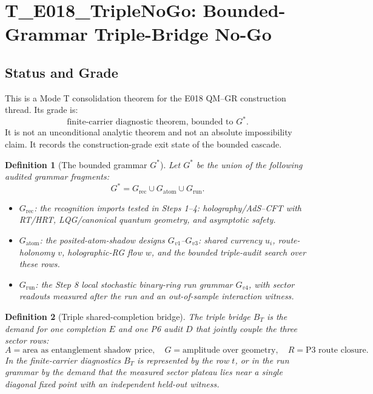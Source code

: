 \documentclass[11pt]{article}
\newtheorem{definition}{Definition}
\begin{document}
\section*{T\_E018\_TripleNoGo: Bounded-Grammar Triple-Bridge No-Go}

\subsection*{Status and Grade}

This is a Mode T consolidation theorem for the E018 QM--GR construction thread.
Its grade is:
\[
  \text{finite-carrier diagnostic theorem, bounded to }G^*.
\]
It is not an unconditional analytic theorem and not an absolute impossibility
claim.  It records the construction-grade exit state of the bounded cascade.

\begin{definition}[The bounded grammar \(G^*\)]
Let \(G^*\) be the union of the following audited grammar fragments:
\[
G^*=G_{\mathrm{rec}}\cup G_{\mathrm{atom}}\cup G_{\mathrm{run}}.
\]
\begin{itemize}
\item \(G_{\mathrm{rec}}\): the recognition imports tested in Steps 1--4:
holography/AdS--CFT with RT/HRT, LQG/canonical quantum geometry, and
asymptotic safety.
\item \(G_{\mathrm{atom}}\): the posited-atom-shadow designs \(G_{v1}\)--\(G_{v3}\):
shared currency \(u_i\), route-holonomy \(v\), holographic-RG flow \(w\), and
the bounded triple-audit search over these rows.
\item \(G_{\mathrm{run}}\): the Step 8 local stochastic binary-ring run grammar
\(G_{v4}\), with sector readouts measured after the run and an out-of-sample
interaction witness.
\end{itemize}
\end{definition}

\begin{definition}[Triple shared-completion bridge]
The triple bridge \(B_T\) is the demand for one completion \(E\) and one P6 audit
\(D\) that jointly couple the three sector rows:
\[
  A=\text{area as entanglement shadow price},\quad
  G=\text{amplitude over geometry},\quad
  R=\text{P3 route closure}.
\]
In the finite-carrier diagnostics \(B_T\) is represented by the row \(t\), or
in the run grammar by the demand that the measured sector plateau lies near a
single diagonal fixed point with an independent held-out witness.
\end{definition}
\end{document}
